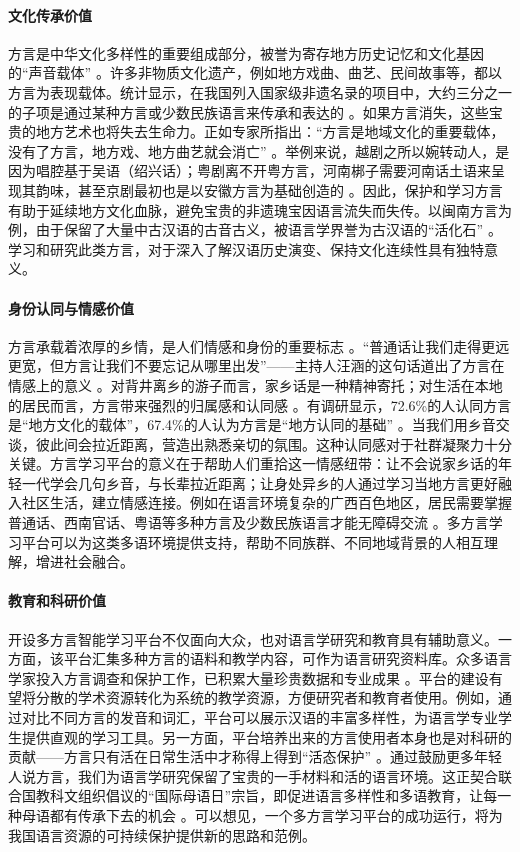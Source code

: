\paragraph{文化传承价值}
方言是中华文化多样性的重要组成部分，被誉为寄存地方历史记忆和文化基因的“声音载体” 。许多非物质文化遗产，例如地方戏曲、曲艺、民间故事等，都以方言为表现载体。统计显示，在我国列入国家级非遗名录的项目中，大约三分之一的子项是通过某种方言或少数民族语言来传承和表达的 。如果方言消失，这些宝贵的地方艺术也将失去生命力。正如专家所指出：“方言是地域文化的重要载体，没有了方言，地方戏、地方曲艺就会消亡” 。举例来说，越剧之所以婉转动人，是因为唱腔基于吴语（绍兴话）；粤剧离不开粤方言，河南梆子需要河南话土语来呈现其韵味，甚至京剧最初也是以安徽方言为基础创造的 。因此，保护和学习方言有助于延续地方文化血脉，避免宝贵的非遗瑰宝因语言流失而失传。以闽南方言为例，由于保留了大量中古汉语的古音古义，被语言学界誉为古汉语的“活化石” 。学习和研究此类方言，对于深入了解汉语历史演变、保持文化连续性具有独特意义。
\paragraph{身份认同与情感价值}
方言承载着浓厚的乡情，是人们情感和身份的重要标志 。“普通话让我们走得更远更宽，但方言让我们不要忘记从哪里出发”——主持人汪涵的这句话道出了方言在情感上的意义 。对背井离乡的游子而言，家乡话是一种精神寄托；对生活在本地的居民而言，方言带来强烈的归属感和认同感 。有调研显示，72.6\%的人认同方言是“地方文化的载体”，67.4\%的人认为方言是“地方认同的基础” 。当我们用乡音交谈，彼此间会拉近距离，营造出熟悉亲切的氛围。这种认同感对于社群凝聚力十分关键。方言学习平台的意义在于帮助人们重拾这一情感纽带：让不会说家乡话的年轻一代学会几句乡音，与长辈拉近距离；让身处异乡的人通过学习当地方言更好融入社区生活，建立情感连接。例如在语言环境复杂的广西百色地区，居民需要掌握普通话、西南官话、粤语等多种方言及少数民族语言才能无障碍交流 。多方言学习平台可以为这类多语环境提供支持，帮助不同族群、不同地域背景的人相互理解，增进社会融合。
\paragraph{教育和科研价值}
开设多方言智能学习平台不仅面向大众，也对语言学研究和教育具有辅助意义。一方面，该平台汇集多种方言的语料和教学内容，可作为语言研究资料库。众多语言学家投入方言调查和保护工作，已积累大量珍贵数据和专业成果 。平台的建设有望将分散的学术资源转化为系统的教学资源，方便研究者和教育者使用。例如，通过对比不同方言的发音和词汇，平台可以展示汉语的丰富多样性，为语言学专业学生提供直观的学习工具。另一方面，平台培养出来的方言使用者本身也是对科研的贡献——方言只有活在日常生活中才称得上得到“活态保护” 。通过鼓励更多年轻人说方言，我们为语言学研究保留了宝贵的一手材料和活的语言环境。这正契合联合国教科文组织倡议的“国际母语日”宗旨，即促进语言多样性和多语教育，让每一种母语都有传承下去的机会 。可以想见，一个多方言学习平台的成功运行，将为我国语言资源的可持续保护提供新的思路和范例。
